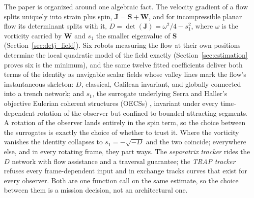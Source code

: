 \documentclass[lettersize,journal]{IEEEtran}
\begin{document}
The paper is organized around one algebraic fact. The velocity
gradient of a flow splits uniquely into strain plus spin, $\mathbf{J} =
\mathbf{S} + \mathbf{W}$, and for incompressible planar flow its
determinant splits with it, $D = \det(\mathbf{J}) = \omega^2/4 -
s_1^2$, where $\omega$ is the vorticity carried by $\mathbf{W}$ and
$s_1$ the smaller eigenvalue of $\mathbf{S}$
(Section~\ref{sec:detj_field}). Six robots measuring the flow at their
own positions determine the local quadratic model of the field exactly
(Section~\ref{sec:estimation} proves six is the minimum), and the same
twelve fitted coefficients deliver both terms of the identity as
navigable scalar fields whose valley lines mark the flow's
instantaneous skeleton: $D$, classical, Galilean invariant, and
globally connected into a trench network; and $s_1$, the surrogate
underlying Serra and Haller's objective Eulerian coherent structures
(OECSs) \cite{17}, invariant under every time-dependent rotation of the
observer but confined to bounded attracting segments. A rotation of the
observer lands entirely in the spin term, so the choice between the
surrogates is exactly the choice of whether to trust it. Where the
vorticity vanishes the identity collapses to $s_1 = -\sqrt{-D}$ and the
two coincide; everywhere else, and in every rotating frame, they part
ways. The \emph{separatrix tracker} rides the $D$ network with flow
assistance and a traversal guarantee; the \emph{TRAP tracker} refuses
every frame-dependent input and in exchange tracks curves that exist
for every observer. Both are one function call on the same estimate, so
the choice between them is a mission decision, not an architectural
one.
\end{document}
